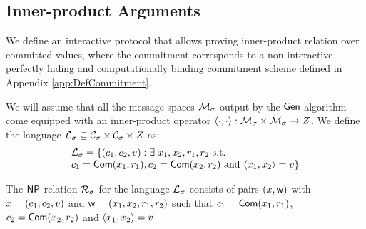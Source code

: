 \subsection{Inner-product Arguments}
We define an interactive protocol that allows proving inner-product relation over committed values, where the commitment corresponds to a non-interactive perfectly hiding and computationally binding commitment scheme defined in Appendix \ref{app:DefCommitment}. %

We will assume that all the message spaces $\mathcal{M}_\sigma$ output by the $\mathsf{Gen}$ algorithm come equipped with an inner-product operator $\langle \cdot,\cdot\rangle:\mathcal{M}_\sigma\times \mathcal{M}_\sigma\rightarrow Z$. We define the language $\mathcal{L}_\sigma\subseteq \mathcal{C}_\sigma\times \mathcal{C}_\sigma\times Z$ as:
\begin{equation*}
\begin{array}{l}
\mathcal{L}_\sigma = \{(c_1,c_2,v):\exists \; x_1,x_2,r_1,r_2 \text{ s.t. } \\
c_1=\mathsf{Com}(x_1,r_1), c_2=\mathsf{Com}(x_2,r_2) \text{ and } \langle x_1,x_2\rangle=v\} 
\end{array}
\end{equation*}

The $\mathsf{NP}$ relation $\mathcal{R}_\sigma$ for the language $\mathcal{L}_\sigma$ consists of pairs $({x},\mathsf{w})$ with ${x}=(c_1,c_2,v)$ and $\mathsf{w}=(x_1,x_2,r_1,r_2)$ such that $c_1=\mathsf{Com}(x_1,r_1)$, $c_2=\mathsf{Com}(x_2,r_2)$ and $\langle x_1,x_2\rangle=v$ 

